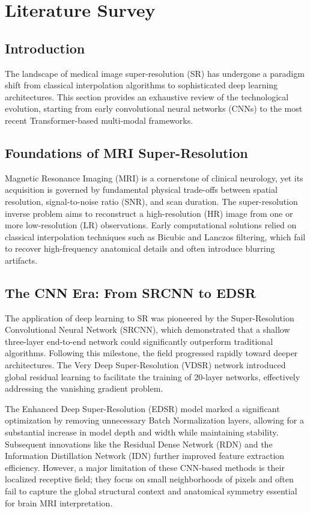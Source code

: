 \chapter{Literature Survey}

\section{Introduction}
The landscape of medical image super-resolution (SR) has undergone a paradigm shift from classical interpolation algorithms to sophisticated deep learning architectures. This section provides an exhaustive review of the technological evolution, starting from early convolutional neural networks (CNNs) to the most recent Transformer-based multi-modal frameworks.

\section{Foundations of MRI Super-Resolution}
Magnetic Resonance Imaging (MRI) is a cornerstone of clinical neurology, yet its acquisition is governed by fundamental physical trade-offs between spatial resolution, signal-to-noise ratio (SNR), and scan duration. The super-resolution inverse problem aims to reconstruct a high-resolution (HR) image from one or more low-resolution (LR) observations. Early computational solutions relied on classical interpolation techniques such as Bicubic and Lanczos filtering, which fail to recover high-frequency anatomical details and often introduce blurring artifacts.

\section{The CNN Era: From SRCNN to EDSR}
The application of deep learning to SR was pioneered by the Super-Resolution Convolutional Neural Network (SRCNN), which demonstrated that a shallow three-layer end-to-end network could significantly outperform traditional algorithms. Following this milestone, the field progressed rapidly toward deeper architectures. The Very Deep Super-Resolution (VDSR) network introduced global residual learning to facilitate the training of 20-layer networks, effectively addressing the vanishing gradient problem. 

The Enhanced Deep Super-Resolution (EDSR) model marked a significant optimization by removing unnecessary Batch Normalization layers, allowing for a substantial increase in model depth and width while maintaining stability. Subsequent innovations like the Residual Dense Network (RDN) and the Information Distillation Network (IDN) further improved feature extraction efficiency. However, a major limitation of these CNN-based methods is their localized receptive field; they focus on small neighborhoods of pixels and often fail to capture the global structural context and anatomical symmetry essential for brain MRI interpretation.

